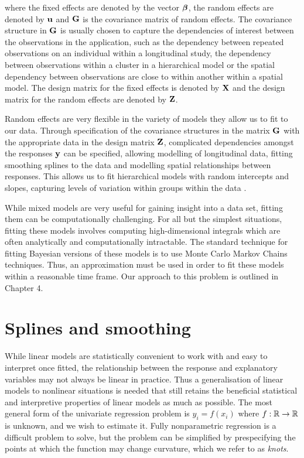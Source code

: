 \noindent 
where the fixed effects are denoted by the vector ${\boldsymbol \beta}$, the random effects
are denoted by ${\bf u}$ and ${\bf G}$ is the covariance matrix of random effects. The
covariance structure in ${\bf G}$ is usually chosen to capture the dependencies of
interest between the observations in the application, such as the dependency
between repeated observations on an individual within a longitudinal study,
the dependency between observations within a cluster in a hierarchical model or the
spatial dependency between observations are close to within another within a
spatial model.
%
The design matrix for the fixed effects is denoted by ${\bf X}$ and
the design matrix for the random effects are denoted by ${\bf Z}$.

Random effects are very flexible in the variety of models they allow us to fit
to our data. Through specification of the covariance structures in the matrix
${\bf G}$ with the appropriate data in the design matrix ${\bf Z}$, complicated
dependencies amongst the responses ${\bf y}$ can be specified, allowing modelling of
longitudinal data, fitting smoothing splines to the data and modelling spatial
relationships between responses. This allows us to fit hierarchical models with
random intercepts and slopes, capturing levels of variation within groups within
the data \citep{Gelman2007}.

While mixed models are very useful for gaining insight into a data set, fitting
them can be computationally challenging. For all but the simplest situations,
fitting these models involves computing high-dimensional integrals which are
often analytically and computationally intractable. The standard technique for
fitting Bayesian versions of these models is to use Monte Carlo Markov Chains
techniques. Thus, an approximation must be used in order to fit these models
within a reasonable time frame. Our approach to this problem is outlined in
Chapter 4.

\section{Splines and smoothing}

While linear models are statistically convenient to work with and easy to
interpret once fitted, the relationship between the response and explanatory
variables may not always be linear in practice. Thus a generalisation of linear
models to nonlinear situations is needed that still retains the beneficial
statistical and interpretive properties of linear models as much as possible.
The most general form of the univariate regression problem is
$ y_i = f(x_i) $
where $f: {\mathbb{R}} \to {\mathbb{R}}$ is unknown, and we wish to estimate it.  Fully
nonparametric regression is a difficult problem to solve, but the problem can
be simplified by prespecifying the points at which the function may change
curvature, which we refer to as \emph{knots}.

